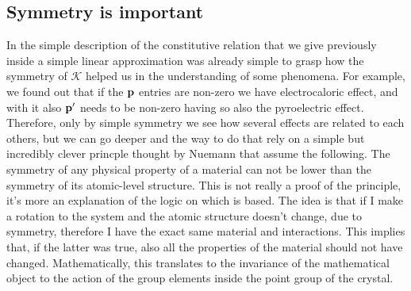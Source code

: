\subsection{Symmetry is important}

In the simple description of the constitutive relation that we give previously inside a simple linear approximation was already simple to grasp how the symmetry of $\mathcal{K}$ helped us in the understanding of some phenomena. For example, we found out that if the $\vb{p}$ entries are non-zero we have electrocaloric effect, and with it also $\vb{p}'$ needs to be non-zero having so also the pyroelectric effect. Therefore, only by simple symmetry we see how several effects are related to each others, but we can go deeper and the way to do that rely on a simple but incredibly clever princple thought by Nuemann that assume the following.
{
    The symmetry of any physical property of a material can not be lower than the symmetry of its atomic-level structure.
}
{
    This is not really a proof of the principle, it's more an explanation of the logic on which is based. The idea is that if I make a rotation to the system and the atomic structure doesn't change, due to symmetry, therefore I have the exact same material and interactions. This implies that, if the latter was true, also all the properties of the material should not have changed. Mathematically, this translates to the invariance of the mathematical object to the action of the group elements inside the point group of the crystal.
}

